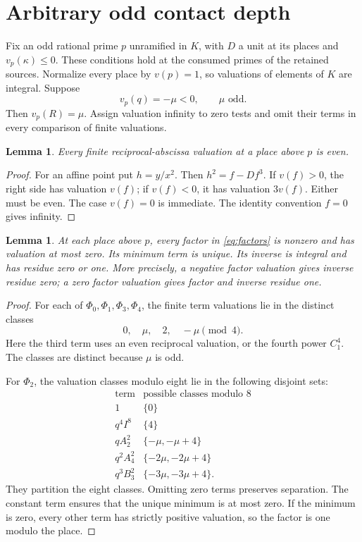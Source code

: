 \documentclass[11pt,a4paper]{article}
\newtheorem{lemma}[theorem]{Lemma}
\begin{document}
\section{Arbitrary odd contact depth}

Fix an odd rational prime $p$ unramified in $K$, with $D$ a unit
at its places and $v_p(\kappa)\le0$. These conditions hold at the
consumed primes of the retained sources. Normalize every place by
$v(p)=1$, so valuations of elements of $K$ are integral.
Suppose
\[
                         v_p(q)=-\mu<0,\qquad \mu\text{ odd}.
\]
Then $v_p(R)=\mu$. Assign valuation infinity to zero tests and
omit their terms in every comparison of finite valuations.

\begin{lemma}\label{lem:even}
Every finite reciprocal-abscissa valuation at a place above $p$
is even.
\end{lemma}
\begin{proof}
For an affine point put $h=y/x^2$. Then $h^2=f-Df^3$.
If $v(f)>0$, the right side has valuation $v(f)$; if $v(f)<0$,
it has valuation $3v(f)$. Either must be even. The case $v(f)=0$
is immediate. The identity convention $f=0$ gives infinity.
\end{proof}

\begin{lemma}\label{lem:separate}
At each place above $p$, every factor in \eqref{eq:factors} is
nonzero and has valuation at most zero. Its minimum term is unique.
Its inverse is integral and has residue zero or one. More precisely,
a negative factor valuation gives inverse residue zero; a zero factor
valuation gives factor and inverse residue one.
\end{lemma}
\begin{proof}
For each of $\Phi_0,\Phi_1,\Phi_3,\Phi_4$, the finite term
valuations lie in the distinct classes
\[
                  0,\quad\mu,\quad2,\quad-\mu\pmod4.
\]
Here the third term uses an even reciprocal valuation, or the fourth
power $C_1^4$. The classes are distinct because $\mu$ is odd.

For $\Phi_2$, the valuation classes modulo eight lie in the
following disjoint sets:
\[
\begin{array}{c|c}
\text{term}&\text{possible classes modulo }8\\\hline
1&\{0\}\\
q^4I^8&\{4\}\\
qA_2^2&\{-\mu,-\mu+4\}\\
q^2A_4^2&\{-2\mu,-2\mu+4\}\\
q^3B_3^2&\{-3\mu,-3\mu+4\}.
\end{array}
\]
They partition the eight classes. Omitting zero terms preserves
separation. The constant term ensures that the unique minimum is
at most zero. If the minimum is zero, every other term has strictly
positive valuation, so the factor is one modulo the place.
\end{proof}
\end{document}
